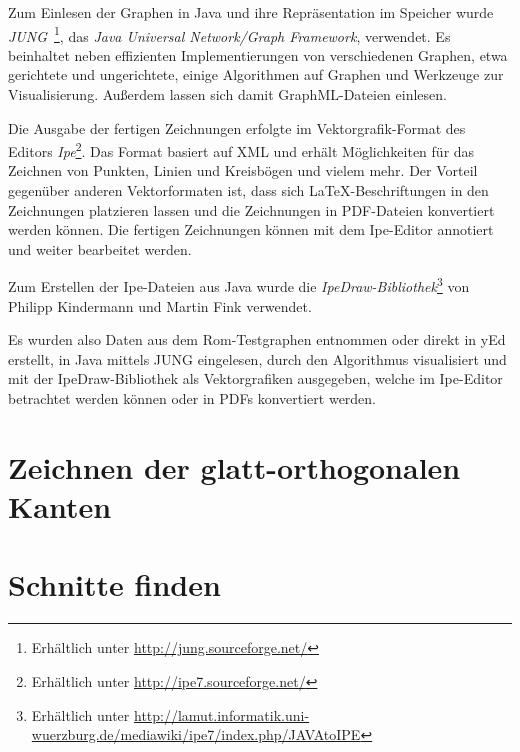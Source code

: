 \documentclass[a4paper]{scrreprt}
\theoremstyle{definition}
\begin{document}
Zum Einlesen der Graphen in Java und ihre Repräsentation im Speicher wurde \emph{JUNG}~\cite{jung}\footnote{Erhältlich unter \url{http://jung.sourceforge.net/}}, das \emph{Java Universal Network/Graph Framework}, verwendet. Es beinhaltet neben effizienten Implementierungen von verschiedenen Graphen, etwa gerichtete und ungerichtete, einige Algorithmen auf Graphen und Werkzeuge zur Visualisierung. Außerdem lassen sich damit GraphML-Dateien einlesen.

Die Ausgabe der fertigen Zeichnungen erfolgte im Vektorgrafik-Format des Editors \emph{Ipe}\footnote{Erhältlich unter \url{http://ipe7.sourceforge.net/}}. Das Format basiert auf XML und erhält Möglichkeiten für das Zeichnen von Punkten, Linien und Kreisbögen und vielem mehr. Der Vorteil gegenüber anderen Vektorformaten ist, dass sich \LaTeX-Beschriftungen in den Zeichnungen platzieren lassen und die Zeichnungen in PDF-Dateien konvertiert werden können. Die fertigen Zeichnungen können mit dem Ipe-Editor annotiert und weiter bearbeitet werden.

Zum Erstellen der Ipe-Dateien aus Java wurde die \emph{IpeDraw-Bibliothek}\footnote{Erhältlich unter \url{http://lamut.informatik.uni-wuerzburg.de/mediawiki/ipe7/index.php/JAVAtoIPE}} von Philipp Kindermann und Martin Fink verwendet.

Es wurden also Daten aus dem Rom-Testgraphen entnommen oder direkt in yEd erstellt, in Java mittels JUNG eingelesen, durch den Algorithmus visualisiert und mit der IpeDraw-Bibliothek als Vektorgrafiken ausgegeben, welche im Ipe-Editor betrachtet werden können oder in PDFs konvertiert werden.

\section{Zeichnen der glatt-orthogonalen Kanten}

\section{Schnitte finden}
\end{document}
